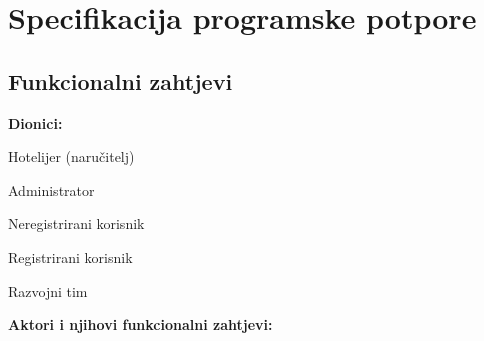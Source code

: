 \chapter{Specifikacija programske potpore}
		
	\section{Funkcionalni zahtjevi}
			
			
				
			
			
			\noindent \textbf{Dionici:}
			
			\begin{packed_enum}
				
				\item Hotelijer (naručitelj)
				\item Administrator
				\item Neregistrirani korisnik	
				\item Registrirani korisnik
				\item Razvojni tim
				
			\end{packed_enum}
			
			\noindent \textbf{Aktori i njihovi funkcionalni zahtjevi:}
			
